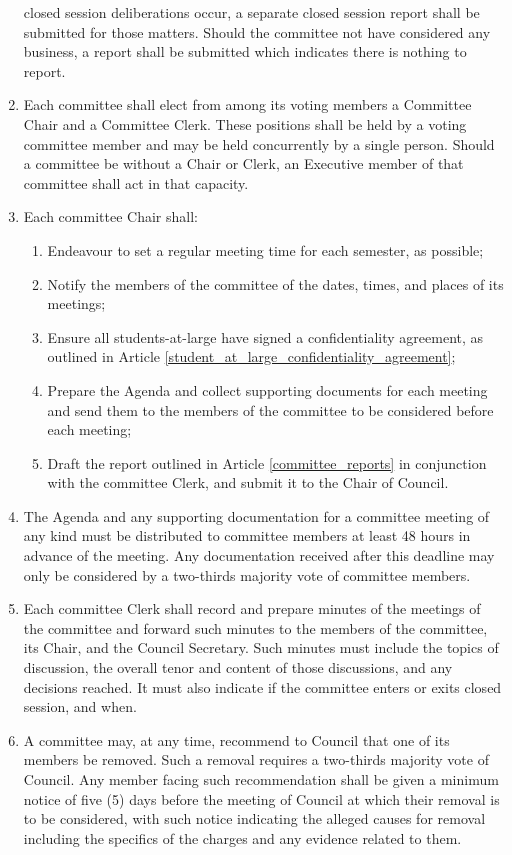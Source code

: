 \documentclass[oneside]{book}
\begin{document}
\begin{enumerate}
closed session deliberations occur, a separate closed session report shall be submitted for those matters. Should the committee not have 
considered any business, a report shall be submitted which indicates there is nothing to report.
\item Each committee shall elect from among its voting members a Committee Chair 
and a Committee Clerk. These positions shall be held by a voting committee 
member and may be held concurrently by a single person. Should a committee be without a Chair or Clerk, an Executive 
member of that committee shall act in that capacity. 
\item \label{committee-chair-responsibilities} Each committee Chair shall: 

\begin{enumerate}
\item Endeavour to set a regular meeting time for each semester, as possible;
\item Notify the members of the committee of the dates, times, and places
of its meetings; 
\item Ensure all students-at-large have signed a confidentiality agreement, as outlined in Article \ref{student_at_large_confidentiality_agreement};
\item Prepare the Agenda and collect supporting documents for each meeting and send them to the members of the 
committee to be considered before each meeting;
\item Draft the report outlined in Article \ref{committee_reports} in conjunction with the committee Clerk, and submit it to the Chair of Council. 
\end{enumerate}

\item The Agenda and any supporting documentation for a committee meeting of any kind must be distributed to committee members at least 48 hours in advance of the meeting. Any documentation received after this deadline may only be considered by a two-thirds majority vote of committee members. 
\item \label{committee-clerk-responsibilities} Each committee Clerk shall record and prepare minutes of the meetings
of the committee and forward such minutes to the members of the committee, its Chair, and the Council Secretary. Such minutes must include 
the topics of discussion, the overall tenor and content of those discussions, and any decisions reached. 
It must also indicate if the committee enters or exits closed session, and when.
\item A committee may, at any time, recommend to Council that one of its members be removed. 
Such a removal requires a two-thirds majority vote of Council. Any member facing such recommendation shall be given a minimum notice of five (5) days before the meeting of Council at which their removal is to be considered, with such notice indicating the alleged causes for removal including the specifics of the charges and any evidence related to them.


\end{enumerate}
\end{document}
